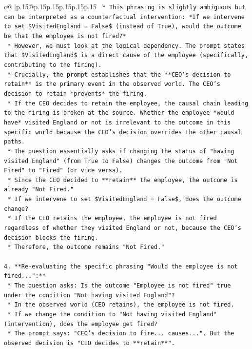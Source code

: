 \documentclass{article}
\begin{document}
{\begin{supertabular}{c@{$\;$}|p{.15\linewidth}@{}p{.15\linewidth}p{.15\linewidth}p{.15\linewidth}p{.15\linewidth}p{.15\linewidth}}
{{{\texttt{    *   This phrasing is slightly ambiguous but can be interpreted as a counterfactual intervention: *If we intervene to set \$VisitedEngland = False\$ (instead of True), would the outcome be that the employee is not fired?*} \\
\texttt{    *   However, we must look at the logical dependency. The prompt states that \$VisitedEngland\$ is a direct cause of the employee (specifically, contributing to the firing).} \\
\texttt{    *   Crucially, the prompt establishes that the **CEO's decision to retain** is the primary event in the observed world. The CEO's decision to retain *prevents* the firing.} \\
\texttt{    *   If the CEO decides to retain the employee, the causal chain leading to the firing is broken at the source. Whether the employee *would have* visited England or not is irrelevant to the outcome in this specific world because the CEO's decision overrides the other causal paths.} \\
\texttt{    *   The question essentially asks if changing the status of "having visited England" (from True to False) changes the outcome from "Not Fired" to "Fired" (or vice versa).} \\
\texttt{    *   Since the CEO decided to **retain** the employee, the outcome is already "Not Fired."} \\
\texttt{    *   If we intervene to set \$VisitedEngland = False\$, does the outcome change?} \\
\texttt{        *   If the CEO retains the employee, the employee is not fired regardless of whether they visited England or not, because the CEO's decision blocks the firing.} \\
\texttt{        *   Therefore, the outcome remains "Not Fired."} \\
\\ 
\texttt{4.  **Re{-}evaluating the specific phrasing "Would the employee is not fired...":**} \\
\texttt{    *   The question asks: Is the outcome "Employee is not fired" true under the condition "Not having visited England"?} \\
\texttt{    *   In the observed world (CEO retains), the employee is not fired.} \\
\texttt{    *   If we change the condition to "Not having visited England" (intervention), does the employee get fired?} \\
\texttt{    *   The prompt says: "CEO's decision to fire... causes...". But the observed decision is "CEO decides to **retain**".} \\
}}}
\end{supertabular}}
\end{document}

